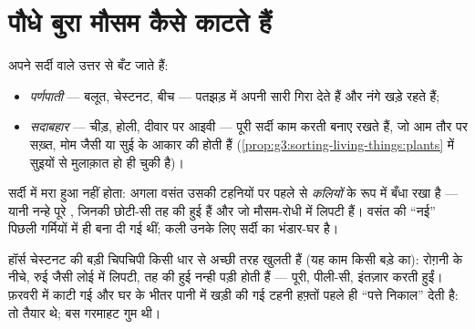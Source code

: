 \section{पौधे बुरा मौसम कैसे काटते हैं}

\begin{definition}[पर्णपाती और सदाबहार]\label{def:g6:life-through-seasons:trees}
 अपने सर्दी वाले उत्तर से बँट जाते हैं:
\begin{itemize}
  \item \emph{पर्णपाती}  --- बलूत, चेस्टनट, बीच
        --- पतझड़ में अपनी सारी  गिरा देते हैं और नंगे खड़े
        रहते हैं;
  \item \emph{सदाबहार}  --- चीड़, होली, दीवार पर
        आइवी --- पूरी सर्दी काम करती  बनाए रखते हैं, जो आम तौर
        पर सख़्त, मोम जैसी या सुई के आकार की होती हैं
        (\cref{prop:g3:sorting-living-things:plants} में सुइयों से
        मुलाक़ात हो ही चुकी है)।
\end{itemize}
\end{definition}

\begin{definition}[कलियाँ]\label{def:g6:life-through-seasons:buds}
सर्दी में   मरा हुआ नहीं होता: अगला वसंत उसकी टहनियों पर
पहले से \emph{कलियों} के रूप में बँधा रखा है --- यानी नन्हे
पूरे , जिनकी  छोटी-सी तह की हुई हैं और जो मौसम-रोधी 
में लिपटी हैं। वसंत की ``नई''  पिछली गर्मियों में ही बना दी गई
थीं; कली उनके लिए सर्दी का भंडार-घर है।
\end{definition}

\begin{example}[चेस्टनट की कली खोलना]\label{ex:g6:life-through-seasons:bud}
हॉर्स चेस्टनट की बड़ी चिपचिपी  किसी धार से अच्छी तरह खुलती हैं
(यह काम किसी बड़े का): रोग़नी  के नीचे, रुई जैसी लोई में लिपटी,
तह की हुई नन्ही  पड़ी होती हैं --- पूरी, पीली-सी, इंतज़ार करती
हुईं। फ़रवरी में काटी गई और घर के भीतर पानी में खड़ी की गई टहनी हफ़्तों
पहले ही ``पत्ते निकाल'' देती है:  तो तैयार थे; बस गरमाहट गुम थी।
\end{example}

